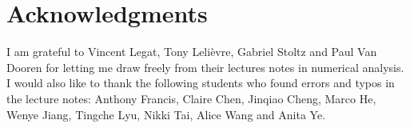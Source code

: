 \chapter*{Acknowledgments}%
\label{cha:acknowledgements}

I am grateful to Vincent Legat, Tony Lelièvre, Gabriel Stoltz and Paul Van Dooren for letting me draw freely from their lectures notes in numerical analysis.
I would also like to thank the following students who found errors and typos in the lecture notes:
Anthony Francis, Claire Chen, Jinqiao Cheng, Marco He, Wenye Jiang, Tingche Lyu, Nikki Tai, Alice Wang and Anita Ye.

